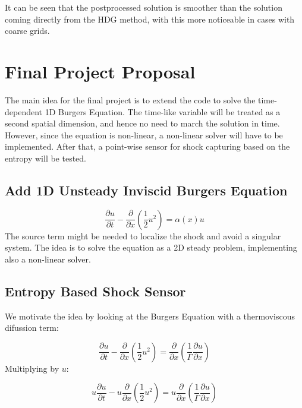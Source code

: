 \documentclass[10pt,a4paper]{article}
\begin{document}
It can be seen that the postprocessed solution is smoother than the solution coming directly from the HDG method, with this more noticeable in cases with coarse grids.
\section*{Final Project Proposal}

The main idea for the final project is to extend the code to solve the time-dependent 
1D Burgers Equation. The time-like variable will be treated as a second spatial dimension, and hence no need to
march the solution in time. However, since the equation is non-linear, a non-linear solver will have to be implemented.
After that, a point-wise sensor for shock capturing based on the entropy will be tested.
\subsection*{Add 1D Unsteady Inviscid Burgers Equation}

\begin{equation}
    \dfrac{\partial u}{\partial t} - \dfrac{\partial }{\partial x}\left(\dfrac{1}{2}u^2\right) = \alpha(x)u
\end{equation}
The source term might be needed to localize the shock and avoid a singular system.
\noindent
The idea is to solve the equation as a 2D steady problem, implementing also a non-linear solver.

\subsection*{Entropy Based Shock Sensor}

We motivate the idea by looking at the Burgers Equation with a thermoviscous difussion term:

\begin{equation}
    \dfrac{\partial u}{\partial t}
    -
    \dfrac{\partial}{\partial x}\left(\dfrac{1}{2}u^2\right)
    =
    \dfrac{\partial}{\partial x}\left(\dfrac{1}{\Gamma}\dfrac{\partial u}{\partial x}\right)
\end{equation}
Multiplying by $u$:

\begin{equation}
    u\dfrac{\partial u}{\partial t}
    -
    u\dfrac{\partial}{\partial x}\left(\dfrac{1}{2}u^2\right)
    =
    u\dfrac{\partial}{\partial x}\left(\dfrac{1}{\Gamma}\dfrac{\partial u}{\partial x}\right)
\end{equation}
\end{document}
